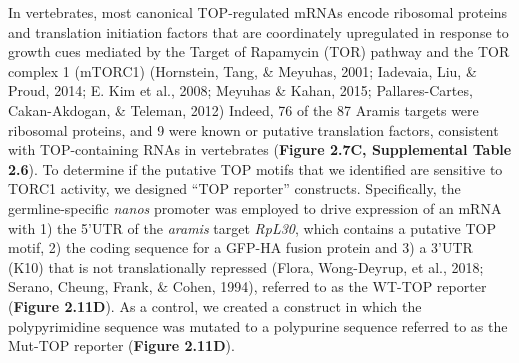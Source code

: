 \documentclass[12pt,oneside]{reedthesis}
\begin{document}
In vertebrates, most canonical TOP-regulated mRNAs encode ribosomal proteins and translation initiation factors that are coordinately upregulated in response to growth cues mediated by the Target of Rapamycin (TOR) pathway and the TOR complex 1 (mTORC1) (Hornstein, Tang, \& Meyuhas, 2001; Iadevaia, Liu, \& Proud, 2014; E. Kim et al., 2008; Meyuhas \& Kahan, 2015; Pallares-Cartes, Cakan-Akdogan, \& Teleman, 2012) Indeed, 76 of the 87 Aramis targets were ribosomal proteins, and 9 were known or putative translation factors, consistent with TOP-containing RNAs in vertebrates (\textbf{Figure 2.7C, Supplemental Table 2.6}). To determine if the putative TOP motifs that we identified are sensitive to TORC1 activity, we designed ``TOP reporter'' constructs. Specifically, the germline-specific \emph{nanos} promoter was employed to drive expression of an mRNA with 1) the 5'UTR of the \emph{aramis} target \emph{RpL30}, which contains a putative TOP motif, 2) the coding sequence for a GFP-HA fusion protein and 3) a 3'UTR (K10) that is not translationally repressed (Flora, Wong-Deyrup, et al., 2018; Serano, Cheung, Frank, \& Cohen, 1994), referred to as the WT-TOP reporter (\textbf{Figure 2.11D}). As a control, we created a construct in which the polypyrimidine sequence was mutated to a polypurine sequence referred to as the Mut-TOP reporter (\textbf{Figure 2.11D}).
\end{document}
